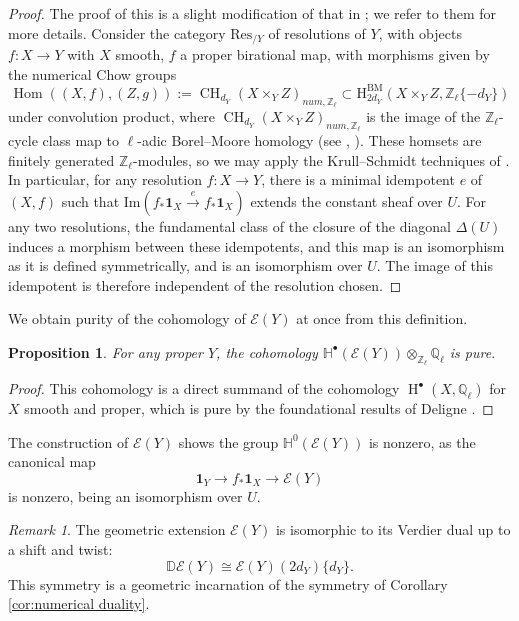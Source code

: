 \documentclass[11pt]{article}
\DeclareMathOperator{\Hom}{Hom}
\DeclareMathOperator{\CH}{\mathrm{CH}}
\DeclareMathOperator{\hH}{\mathrm{H}}
\newtheorem{prop}[thm]{Proposition}
\theoremstyle{remark}
\newtheorem{rem}[thm]{Remark}
\theoremstyle{definition}
\begin{document}
\begin{proof}
    The proof of this is a slight modification of that in \cite{HW23,McN18}; we refer to them for more details. 
    Consider the category  $\text{Res}_{/Y}$ of resolutions of $Y$, with objects $f:X\to Y$ with $X$ smooth, $f$ a proper birational map, with morphisms given by the numerical Chow groups
    \[\Hom((X,f),(Z,g)):=\CH_{d_Y}(X\times_Y Z)_{num,\mathbb{Z}_\ell}\subset \text{H}_{2d_Y}^{\text{BM}}(X\times_Y Z,\mathbb{Z}_\ell\{-d_Y\})\] 
    under convolution product, where $\CH_{d_Y}(X\times_Y Z)_{num,\mathbb{Z}_\ell}$ is the image of the $\mathbb{Z}_\ell$-cycle class map to $\ell$-adic Borel--Moore homology (see \cite[\S6]{Mi80}, \cite[\S4]{De77}). 
    These homsets are finitely generated $\mathbb{Z}_\ell$-modules, so we may apply the Krull--Schmidt techniques of \cite[\S4]{HW23}. 
    In particular, for any resolution $f:X\to Y$, there is a minimal idempotent $e$ of $(X,f)$ such that $\text{Im}(f_*\mathbf{1}_X\xrightarrow{e} f_*\mathbf{1}_X)$ extends the constant sheaf over $U$. 
    For any two resolutions, the fundamental class of the closure of the diagonal $\Delta(U)$ induces a morphism between these idempotents, and this map is an isomorphism as it is defined symmetrically, and is an isomorphism over $U$. 
    The image of this idempotent is therefore independent of the resolution chosen.
\end{proof}
We obtain purity of the cohomology of $\mathscr{E}(Y)$ at once from this definition.
\begin{prop}
For any proper $Y$, the cohomology $\mathbb{H}^\bullet(\mathscr{E}(Y))\otimes_{\mathbb{Z}_\ell} \mathbb{Q}_\ell$ is pure.
\end{prop}

\begin{proof}
This cohomology is a direct summand of the cohomology $\hH^\bullet(X,\mathbb{Q}_\ell)$ for $X$ smooth and proper, which is pure by the foundational results of Deligne \cite{De80}.
\end{proof}

The construction of $\mathscr{E}(Y)$ shows the group $\mathbb{H}^0(\mathscr{E}(Y))$ is nonzero, as the canonical map \[\mathbf{1}_Y\to f_*\mathbf{1}_X\to \mathscr{E}(Y)\] is nonzero, being an isomorphism over $U$.
\begin{rem}
The geometric extension $\mathscr{E}(Y)$ is isomorphic to its Verdier dual up to a shift and twist: \[\mathbb{D}\mathscr{E}(Y)\cong \mathscr{E}(Y)(2d_Y)\{d_Y\}.\] This symmetry is a geometric incarnation of the symmetry of Corollary \ref{cor:numerical duality}.
\end{rem}
\end{document}
